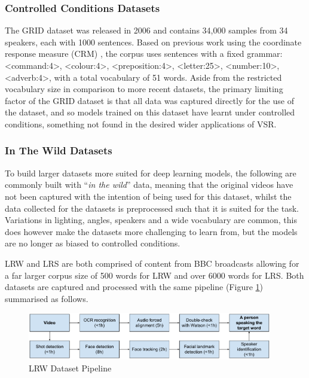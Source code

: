 \subsubsection{Controlled Conditions Datasets}
The GRID dataset was released in 2006 \cite{Cooke2006} and contains 34,000 samples from 34 speakers, each with 1000 sentences.
Based on previous work using the coordinate response measure (CRM) \cite{Bolia2000}, the corpus uses sentences with a fixed grammar: <command:4>, <colour:4>, <preposition:4>, <letter:25>, <number:10>, <adverb:4>, with a total vocabulary of 51 words.
Aside from the restricted vocabulary size in comparison to more recent datasets, the primary limiting factor of the GRID dataset is that all data was captured directly for the use of the dataset, and so models trained on this dataset have learnt under controlled conditions, something not found in the desired wider applications of VSR.

\subsubsection{In The Wild Datasets}
To build larger datasets more suited for deep learning models, the following are commonly built with ``\textit{in the wild}'' data, meaning that the original videos have not been captured with the intention of being used for this dataset, whilst the data collected for the datasets is preprocessed such that it is suited for the task.
Variations in lighting, angles, speakers and a wide vocabulary are common, this does however make the datasets more challenging to learn from, but the models are no longer as biased to controlled conditions.

LRW and LRS are both comprised of content from BBC broadcasts \cite{Chung2016, Chung2017} allowing for a far larger corpus size of 500 words for LRW and over 6000 words for LRS.
Both datasets are captured and processed with the same pipeline (Figure \ref{fig:LRW_Pipeline}) summarised as follows. 

\begin{figure}[h]
    \centering
        \includegraphics[width=0.95\textwidth]{figures/lit_review/lrw_pipeline.png}
    \caption{LRW Dataset Pipeline \cite{Chung2016}}\label{fig:LRW_Pipeline}
\end{figure}

